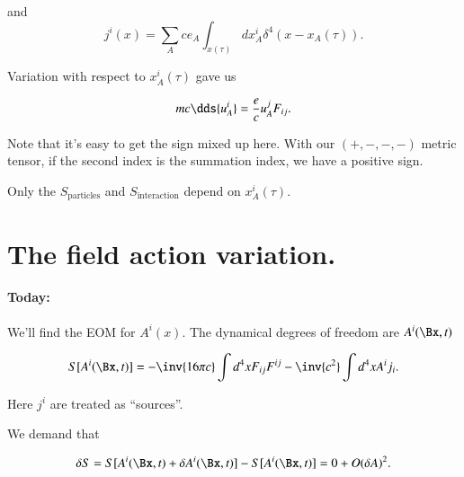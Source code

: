 and
\begin{equation}\label{eqn:relativisticElectrodynamicsL13:70}
j^i(x) = \sum_A c e_A \int_{x(\tau)} dx_A^i \delta^4( x - x_A(\tau)).
\end{equation}

Variation with respect to $x_A^i(\tau)$ gave us

\begin{equation}\label{eqn:relativisticElectrodynamicsL13:90}
m c \dds{u^i_A} = \frac{e}{c} u_A^j F_{ij}.
\end{equation}

Note that it's easy to get the sign mixed up here.  With our $(+,-,-,-)$ metric tensor, if the second index is the summation index, we have a positive sign.

Only the $S_{\text{particles}}$ and $S_{\text{interaction}}$ depend on $x_A^i(\tau)$.

\section{The field action variation.}

\paragraph{Today:} We'll find the EOM for $A^i(x)$.  The dynamical degrees of freedom are $A^i(\Bx,t)$

\begin{equation}\label{eqn:relativisticElectrodynamicsL13:110}
S[A^i(\Bx, t)] = -\inv{16 \pi c} \int d^4x F_{ij}F^{ij} - \inv{c^2} \int d^4 x A^i j_i.
\end{equation}

Here $j^i$ are treated as ``sources''.

We demand that

\begin{equation}\label{eqn:relativisticElectrodynamicsL13:130}
\delta S = S[ A^i(\Bx, t) + \delta A^i(\Bx, t)] - S[ A^i(\Bx, t) ] = 0 + O(\delta A)^2.
\end{equation}


